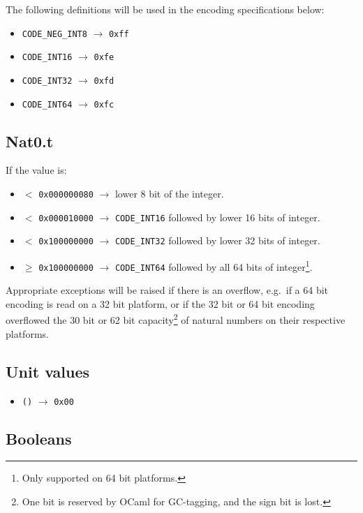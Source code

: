 \documentclass[12pt]{article}
\begin{document}
\noindent The following definitions will be used in the encoding
specifications below:

\begin{itemize}
\item \verb=CODE_NEG_INT8= $\rightarrow$ \verb=0xff=
\item \verb=CODE_INT16= $\rightarrow$ \verb=0xfe=
\item \verb=CODE_INT32= $\rightarrow$ \verb=0xfd=
\item \verb=CODE_INT64= $\rightarrow$ \verb=0xfc=
\end{itemize}

\subsection{Nat0.t}

If the value is:

\begin{itemize}
\item $<$ \verb=0x000000080= $\rightarrow$ lower 8 bit of the integer.
\item $<$ \verb=0x000010000= $\rightarrow$ \verb=CODE_INT16= followed by lower 16 bits of integer.
\item $<$ \verb=0x100000000= $\rightarrow$ \verb=CODE_INT32= followed by lower 32 bits of integer.
\item $\geq$ \verb=0x100000000= $\rightarrow$ \verb=CODE_INT64= followed by all 64 bits of integer\footnote{Only supported on 64 bit platforms.}.
\end{itemize}

Appropriate exceptions will be raised if there is an overflow, e.g.\ if
a 64 bit encoding is read on a 32 bit platform, or if the 32 bit or 64
bit encoding overflowed the 30 bit or 62 bit capacity\footnote{One
bit is reserved by OCaml for GC-tagging, and the sign bit is lost.}
of natural numbers on their respective platforms.

\subsection{Unit values}

\begin{itemize}
\item \verb=()= $\rightarrow$ \verb=0x00=
\end{itemize}

\subsection{Booleans}
\end{document}
